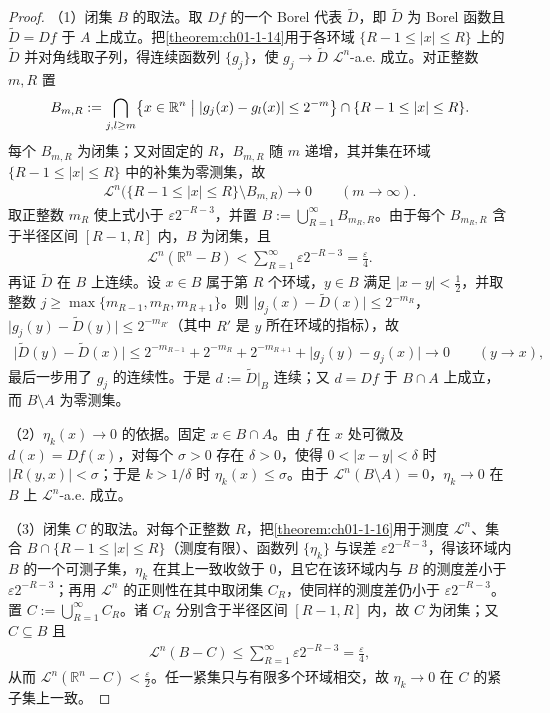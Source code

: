 \documentclass[../../main.tex]{subfiles}%
\begin{document}
\begin{proof}
（1）闭集 $B$ 的取法。取 $Df$ 的一个 Borel 代表 $\tilde D$，即 $\tilde D$ 为 Borel 函数且 $\tilde D=Df$ 于 $A$ 上成立。把\cref{theorem:ch01-1-14}用于各环域 $\{R-1\le\lvert x\rvert\le R\}$ 上的 $\tilde D$ 并对角线取子列，得连续函数列 $\{g_j\}$，使 $g_j\to\tilde D$ $\mathcal{L}^n$-a.e. 成立。对正整数 $m,R$ 置%
\begin{align*}
B_{m,R}:=\bigcap_{j,l\ge m}\bigl\{x\in\mathbb{R}^n\bigm|\lvert g_j(x)-g_l(x)\rvert\le2^{-m}\bigr\}\cap\{R-1\le\lvert x\rvert\le R\}.
\end{align*}
每个 $B_{m,R}$ 为闭集；又对固定的 $R$，$B_{m,R}$ 随 $m$ 递增，其并集在环域 $\{R-1\le\lvert x\rvert\le R\}$ 中的补集为零测集，故
\begin{align*}
\mathcal{L}^n\bigl(\{R-1\le\lvert x\rvert\le R\}\setminus B_{m,R}\bigr)\longrightarrow0\qquad(m\to\infty).
\end{align*}
取正整数 $m_R$ 使上式小于 $\varepsilon2^{-R-3}$，并置 $B:=\bigcup_{R=1}^{\infty}B_{m_R,R}$。由于每个 $B_{m_R,R}$ 含于半径区间 $[R-1,R]$ 内，$B$ 为闭集，且
\begin{align*}
\mathcal{L}^n(\mathbb{R}^n-B)<\sum_{R=1}^{\infty}\varepsilon2^{-R-3}=\frac{\varepsilon}{4}.
\end{align*}
再证 $\tilde D$ 在 $B$ 上连续。设 $x\in B$ 属于第 $R$ 个环域，$y\in B$ 满足 $\lvert x-y\rvert<\frac12$，并取整数 $j\ge\max\{m_{R-1},m_R,m_{R+1}\}$。则 $\lvert g_j(x)-\tilde D(x)\rvert\le2^{-m_R}$，$\lvert g_j(y)-\tilde D(y)\rvert\le2^{-m_{R'}}$（其中 $R'$ 是 $y$ 所在环域的指标），故
\begin{align*}
\lvert\tilde D(y)-\tilde D(x)\rvert\le2^{-m_{R-1}}+2^{-m_R}+2^{-m_{R+1}}+\lvert g_j(y)-g_j(x)\rvert\longrightarrow0\qquad(y\to x),
\end{align*}
最后一步用了 $g_j$ 的连续性。于是 $d:=\tilde D|_B$ 连续；又 $d=Df$ 于 $B\cap A$ 上成立，而 $B\setminus A$ 为零测集。%

（2）$\eta_k(x)\to0$ 的依据。固定 $x\in B\cap A$。由 $f$ 在 $x$ 处可微及 $d(x)=Df(x)$，对每个 $\sigma>0$ 存在 $\delta>0$，使得 $0<\lvert x-y\rvert<\delta$ 时 $\lvert R(y,x)\rvert<\sigma$；于是 $k>1/\delta$ 时 $\eta_k(x)\le\sigma$。由于 $\mathcal{L}^n(B\setminus A)=0$，$\eta_k\to0$ 在 $B$ 上 $\mathcal{L}^n$-a.e. 成立。

（3）闭集 $C$ 的取法。对每个正整数 $R$，把\cref{theorem:ch01-1-16}用于测度 $\mathcal{L}^n$、集合 $B\cap\{R-1\le\lvert x\rvert\le R\}$（测度有限）、函数列 $\{\eta_k\}$ 与误差 $\varepsilon2^{-R-3}$，得该环域内 $B$ 的一个可测子集，$\eta_k$ 在其上一致收敛于 $0$，且它在该环域内与 $B$ 的测度差小于 $\varepsilon2^{-R-3}$；再用 $\mathcal{L}^n$ 的正则性在其中取闭集 $C_R$，使同样的测度差仍小于 $\varepsilon2^{-R-3}$。置 $C:=\bigcup_{R=1}^{\infty}C_R$。诸 $C_R$ 分别含于半径区间 $[R-1,R]$ 内，故 $C$ 为闭集；又 $C\subseteq B$ 且%
\begin{align*}
\mathcal{L}^n(B-C)\le\sum_{R=1}^{\infty}\varepsilon2^{-R-3}=\frac{\varepsilon}{4},
\end{align*}
从而 $\mathcal{L}^n(\mathbb{R}^n-C)<\frac{\varepsilon}{2}$。任一紧集只与有限多个环域相交，故 $\eta_k\to0$ 在 $C$ 的紧子集上一致。%


\end{proof}
\end{document}
